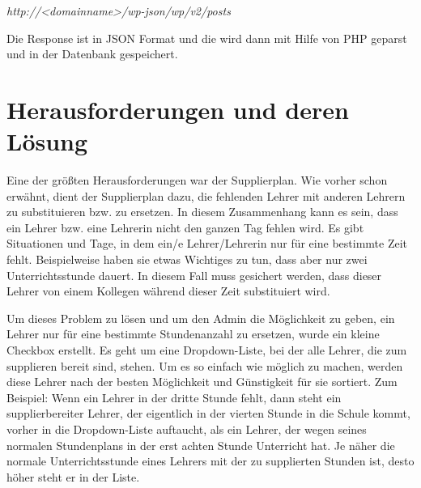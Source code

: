\begin{center}
	\textit{http://\textless{}\textit{domainname}\textgreater{}/wp-json/wp/v2/posts}
	
\end{center}


Die Response ist in JSON Format und die wird dann mit Hilfe von PHP geparst und in der Datenbank gespeichert. 


\section{Herausforderungen und deren Lösung}

Eine der größten Herausforderungen war der Supplierplan. Wie vorher schon erwähnt, dient der Supplierplan  dazu, die fehlenden Lehrer mit anderen Lehrern zu substituieren bzw. zu ersetzen. In diesem Zusammenhang kann es sein, dass ein Lehrer bzw. eine Lehrerin nicht den ganzen Tag fehlen wird. Es gibt Situationen und Tage, in dem ein/e Lehrer/Lehrerin nur für eine bestimmte Zeit fehlt. Beispielweise haben sie etwas Wichtiges zu tun, dass aber nur zwei Unterrichtsstunde dauert. In diesem Fall muss gesichert werden, dass dieser Lehrer von einem Kollegen während dieser Zeit substituiert wird.


Um dieses Problem zu lösen und um den Admin die Möglichkeit zu geben, ein Lehrer nur für eine bestimmte Stundenanzahl zu ersetzen, wurde ein kleine Checkbox erstellt. Es geht um eine Dropdown-Liste, bei der alle Lehrer, die zum supplieren bereit sind, stehen. Um es so einfach wie möglich zu machen, werden diese Lehrer nach der besten Möglichkeit und Günstigkeit für sie sortiert. Zum Beispiel:  Wenn ein Lehrer in der dritte Stunde fehlt, dann steht ein supplierbereiter Lehrer, der eigentlich in der vierten Stunde in die Schule kommt, vorher in die Dropdown-Liste auftaucht, als ein Lehrer, der wegen seines normalen Stundenplans in der erst achten Stunde Unterricht hat. Je näher die normale Unterrichtsstunde eines Lehrers mit der zu supplierten Stunden ist, desto höher steht er in der Liste.
